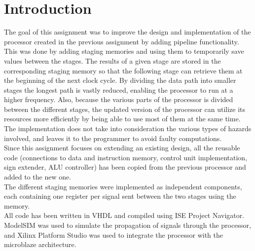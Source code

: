 \section{Introduction}
\label{introduction}
The goal of this assignment was to improve the design and implementation of the processor created in the previous assignment by adding pipeline functionality. This was done by adding staging memories and using them to temporarily save values between the stages. The results of a given stage are stored in the corresponding staging memory so that the following stage can retrieve them at the beginning of the next clock cycle. By dividing the data path into smaller stages the longest path is vastly reduced, enabling the processor to run at a higher frequency. Also, because the various parts of the processor is divided between the different stages, the updated version of the processor can utilize its resources more efficiently by being able to use most of them at the same time.\\

The implementation does not take into consideration the various types of hazards involved, and leaves it to the programmer to avoid faulty computations.\\

Since this assignment focuses on extending an existing design, all the reusable code (connections to data and instruction memory, control unit implementation, sign extender, ALU controller) has been copied from the previous processor and added to the new one.\\

The different staging memories were implemented as independent components, each containing one register per signal sent between the two stages using the memory.\\

All code has been written in VHDL and compiled using ISE Project Navigator. ModelSIM was used to simulate the propagation of signals through the processor, and Xilinx Platform Studio was used to integrate the processor with the microblaze architecture.\\

